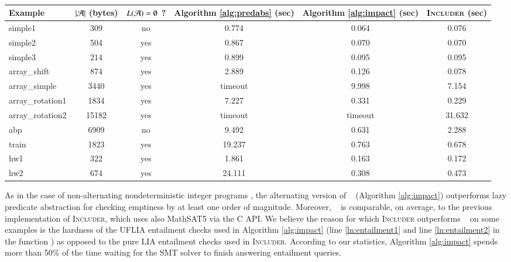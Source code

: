\documentclass[10pt]{llncs}
\begin{document}
\begin{table}[htb]
\vspace*{-\baselineskip}
\begin{center}
{\fontsize{8}{9}\selectfont
\begin{tabular}{||l|c|c|c|c|c||}
\hline
Example & ${|{\mathcal{A}}|}$ (bytes) & $L(\mathcal{A})=\emptyset$ ? & Algorithm \ref{alg:predabs} (sec) & Algorithm \ref{alg:impact} (sec) & \textsc{Includer} (sec) \\
\hline
simple1 & 309 & no & 0.774 & 0.064 & 0.076\\
\hline
simple2 & 504 & yes & 0.867 & 0.070 & 0.070\\
\hline
simple3 & 214 & yes & 0.899 & 0.095 & 0.095\\
\hline
array\_shift & 874 & yes & 2.889 & 0.126 & 0.078\\
\hline
array\_simple & 3440 & yes & timeout & 9.998 & 7.154\\
\hline
array\_rotation1 & 1834 & yes & 7.227 & 0.331 & 0.229\\
\hline
array\_rotation2 & 15182 & yes & timeout & timeout & 31.632\\
\hline
abp & 6909 & no & 9.492 & 0.631 & 2.288\\
\hline
train & 1823 & yes & 19.237 & 0.763 & 0.678\\
\hline
hw1 & 322 & yes & 1.861 & 0.163 & 0.172\\
\hline
hw2 & 674 & yes & 24.111 & 0.308 & 0.473\\
\hline
\end{tabular}
}
\caption{}\label{tab:experiments}
\end{center}
\vspace*{-2\baselineskip}
\end{table}

As in the case of non-alternating nondeterministic integer programs
\cite{mcmillan06}, the alternating version of \impact~ (Algorithm
\ref{alg:impact}) outperforms lazy predicate abstraction for checking
emptiness by at least one order of magnitude. Moreover, \impact~ is
comparable, on average, to the previous implementation of
\textsc{Includer}, which uses also MathSAT5 via the C API. We believe
the reason for which \textsc{Includer} outperforms \impact~ on some
examples is the hardness of the UFLIA entailment checks used in
Algorithm \ref{alg:impact} (line \ref{ln:entailment1} and line
\ref{ln:entailment2} in the function ) as opposed to the
pure LIA entailment checks used in \textsc{Includer}. According to our
statistics, Algorithm \ref{alg:impact} spends more than 50\% of the
time waiting for the SMT solver to finish answering entailment
queries.

 

\end{document}
